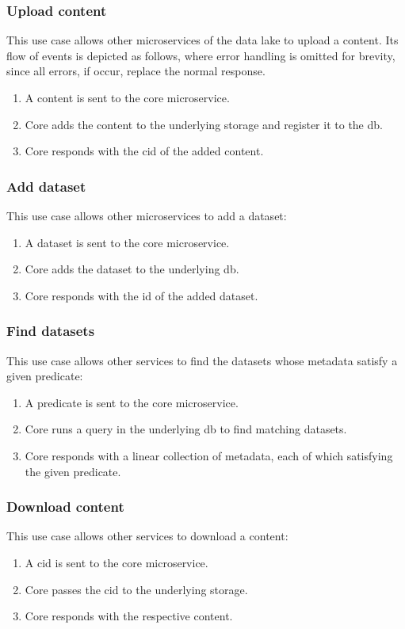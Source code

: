 \documentclass[a4paper,oneside,12pt]{book}
\begin{document}
\subsubsection{Upload content}
This use case allows other microservices of the data lake to upload
a \gls{content}.  Its flow of events is depicted as follows,
where error handling is omitted for brevity, since all errors, if occur,
replace the normal response.
\begin{enumerate}
  \item A \gls{content} is sent to the core microservice.
  \item Core adds the content to the underlying storage
    and register it to the \gls{db}.
  \item Core responds with the \gls{cid} of the added \gls{content}.
\end{enumerate}

\subsubsection{Add dataset}
This use case allows other microservices to add a dataset:
\begin{enumerate}
  \item A dataset is sent to the core microservice.
  \item Core adds the dataset to the underlying \gls{db}.
  \item Core responds with the \gls{id} of the added dataset.
\end{enumerate}

\subsubsection{Find datasets}
This use case allows other services to find the datasets
whose metadata satisfy a given \gls{predicate}:
\begin{enumerate}
  \item A \gls{predicate} is sent to the core microservice.
  \item Core runs a query in the underlying \gls{db} to find matching datasets.
  \item Core responds with a linear collection of metadata,
    each of which satisfying the given \gls{predicate}.
\end{enumerate}

\subsubsection{Download content}
This use case allows other services to download a \gls{content}:
\begin{enumerate}
  \item A \gls{cid} is sent to the core microservice.
  \item Core passes the \gls{cid} to the underlying storage.
  \item Core responds with the respective \gls{content}.
\end{enumerate}
\end{document}
